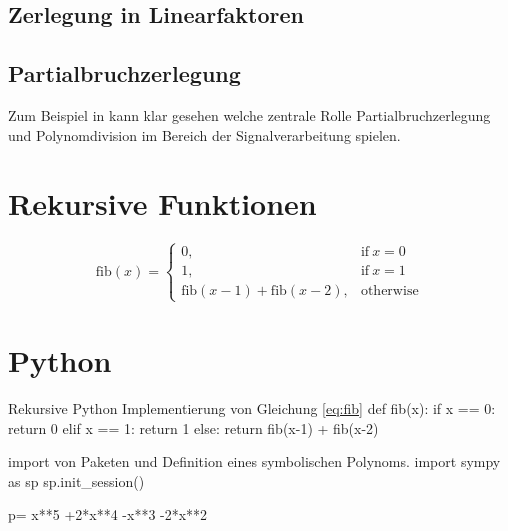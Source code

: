 \subsection{Zerlegung in Linearfaktoren}\label{sec:linearfaktoren}





\subsection{Partialbruchzerlegung}

Zum Beispiel in \cite{liski2019converting} kann klar gesehen welche zentrale Rolle Partialbruchzerlegung und Polynomdivision im Bereich der Signalverarbeitung spielen.

\cite{freeman2011} 


\section{Rekursive Funktionen}
\begin{equation}
	 \displaystyle \mathrm{fib}(x) = \left\{ \begin{array}{ll} 0, & \mathrm{if} \ x = 0 \\ 1, & \mathrm{if} \ x = 1 \\ \mathrm{fib} \mathopen{}\left( x - 1 \mathclose{}\right) + \mathrm{fib} \mathopen{}\left( x - 2 \mathclose{}\right), & \mathrm{otherwise} \end{array} \right. \label{eq:fib}
\end{equation}

\section{Python}\label{sec:python}


\begin{python}{Rekursive Python Implementierung von Gleichung \ref{eq:fib}}
def fib(x):
	if x == 0:
		return 0
	elif x == 1:
		return 1
	else:
		return fib(x-1) + fib(x-2)
\end{python}


\begin{python}{import von Paketen und Definition eines symbolischen Polynoms.}
import sympy as sp
sp.init_session()

p= x**5 +2*x**4 -x**3 -2*x**2
\end{python}

